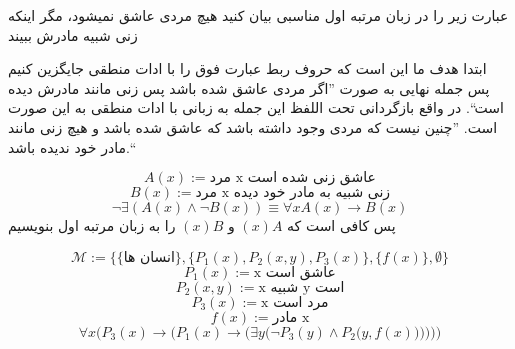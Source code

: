 عبارت زیر را در زبان مرتبه اول مناسبی بیان کنید
هیچ مردی عاشق نمیشود، مگر اینکه زنی شبیه مادرش ببیند
\begin{ans}
	ابتدا هدف ما این است که حروف ربط عبارت فوق را با ادات منطقی جایگزین کنیم پس جمله نهایی به صورت ''اگر مردی عاشق شده باشد پس زنی مانند مادرش دیده است``. در واقع بازگردانی تحت اللفظ این جمله به زبانی با ادات منطقی به این صورت است. ''چنین نیست که مردی وجود داشته باشد که عاشق شده باشد و هیچ زنی مانند مادر خود ندیده باشد.``
	
		$$
		A(x) := \text{مرد x عاشق زنی شده است}
		$$
		$$
		B(x) := \text{مرد x زنی شبیه به مادر خود دیده}
		$$
		$$
		\neg\exists (A(x) \wedge \neg B(x)) \equiv \forall x  A(x) \rightarrow {B(x)}
		$$
		پس کافی است که $(x)A$ و $(x)B$ را به زبان مرتبه اول بنویسیم	
		
		$$
			\mathcal{M} := \{\{\text{انسان ها}\}, \{P_1(x), P_2(x, y), P_3(x)\}, \{f(x)\}, \emptyset\}
		$$
		$$
			{P_1}(x) := \text{x عاشق است}
		$$
		$$
			{P_2}(x, y) := \text{x شبیه y است}
		$$
		$$
			{P_3}(x) := \text{x مرد است}
		$$
		$$
			f(x) := \text{مادر x}
		$$
		$$
			\forall x \Big({P_3}(x) \rightarrow \Big({{P_1}(x) \rightarrow \Big({\exists y \Big(\neg {P_3}(y) \wedge {P_2}\Big(y, f(x)\Big)\Big)}}\Big)  \Big)\Big)
		$$
		
	
\end{ans}
